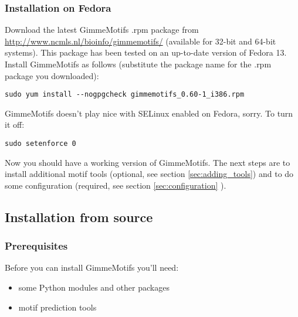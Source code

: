 \documentclass[11pt]{article}
\begin{document}
\subsubsection{Installation on Fedora}
Download the latest GimmeMotifs .rpm package from \url{http://www.ncmls.nl/bioinfo/gimmemotifs/} (available for 32-bit and 64-bit systems). This package has been tested on an up-to-date version of Fedora 13. Install GimmeMotifs as follows (substitute the package name for the .rpm package you downloaded):
\begin{verbatim}
sudo yum install --nogpgcheck gimmemotifs_0.60-1_i386.rpm 
\end{verbatim}
GimmeMotifs doesn't play nice with SELinux enabled on Fedora, sorry. To turn it off:
\begin{verbatim}
sudo setenforce 0
\end{verbatim}
Now you should have a working version of GimmeMotifs. The next steps are to install additional motif tools (optional, see section \ref{sec:adding_tools}) and to do some configuration (required, see section \ref{sec:configuration} ).

\subsection{Installation from source}

\subsubsection{Prerequisites}
Before you can install GimmeMotifs you'll need: 
\begin{itemize}
 \item some Python modules and other packages 
 \item motif prediction tools
\end{itemize}
\end{document}
